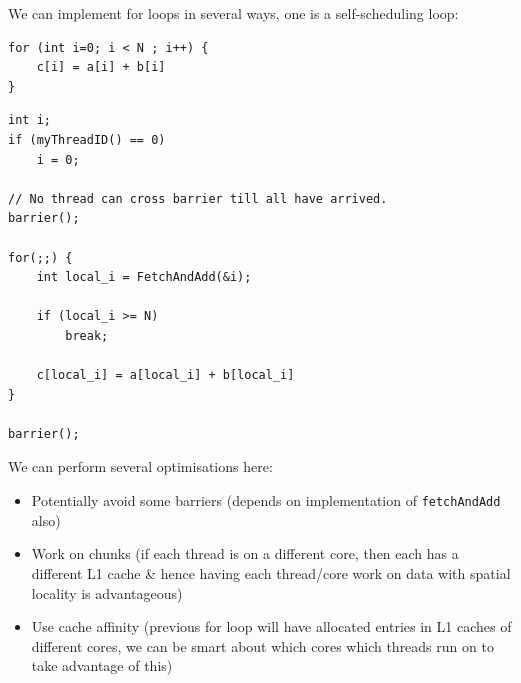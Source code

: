 We can implement for loops in several ways, one is a self-scheduling loop:
\begin{verbatim}
for (int i=0; i < N ; i++) {
    c[i] = a[i] + b[i]
}
\end{verbatim}
\begin{verbatim}
int i;
if (myThreadID() == 0)
    i = 0;

// No thread can cross barrier till all have arrived.
barrier();

for(;;) {
    int local_i = FetchAndAdd(&i);

    if (local_i >= N) 
        break;

    c[local_i] = a[local_i] + b[local_i]
}   

barrier();
\end{verbatim}
We can perform several optimisations here:
\begin{itemize}
	\item Potentially avoid some barriers (depends on implementation of \texttt{fetchAndAdd} also)
	\item Work on chunks (if each thread is on a different core, then each has a different L1 cache \& hence having each thread/core work on data with spatial locality is advantageous)
	\item Use cache affinity (previous for loop will have allocated entries in L1 caches of different cores, we can be smart about which cores which threads run on to take advantage of this)
\end{itemize}

